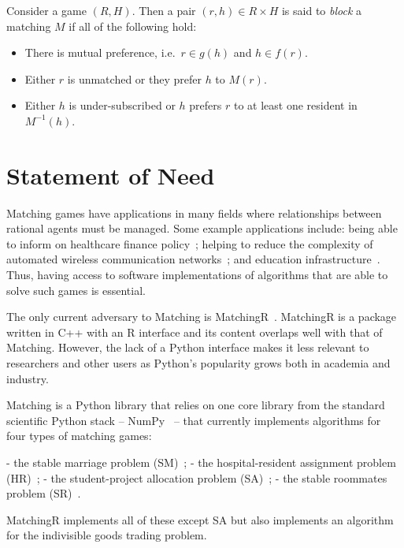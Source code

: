 \begin{definition}\label{def:blocking}
    Consider a game \((R, H)\). Then a pair \((r, h) \in R \times H\) is said to
    \emph{block} a matching \(M\) if all of the following hold:
    \begin{itemize}
        \item There is mutual preference, i.e.\ \(r \in g(h)\) and \(h \in
            f(r)\).
        \item Either \(r\) is unmatched or they prefer \(h\) to \(M(r)\).
        \item Either \(h\) is under-subscribed or \(h\) prefers \(r\) to at
            least one resident in \(M^{-1}(h)\).
    \end{itemize}
\end{definition}


\section{Statement of Need}

Matching games have applications in many fields where relationships between
rational agents must be managed. Some example applications include: being able
to inform on healthcare finance policy~\cite{Agarwal2017}; helping to reduce the
complexity of automated wireless communication networks~\cite{Bayat2016}; and
education infrastructure~\cite{Chiarandini2019}. Thus, having access to software
implementations of algorithms that are able to solve such games is essential.

The only current adversary to Matching is MatchingR~\cite{Tilly2018}. MatchingR
is a package written in C++ with an R interface and its content overlaps well
with that of Matching. However, the lack of a Python interface makes it less
relevant to researchers and other users as Python's popularity grows both in
academia and industry.

Matching is a Python library that relies on one core library from the standard
scientific Python stack -- NumPy~\cite{numpy} -- that currently implements
algorithms for four types of matching games:

- the stable marriage problem (SM)~\cite{Gale1962};
- the hospital-resident assignment problem (HR)~\cite{Gale1962,Roth1984};
- the student-project allocation problem (SA)~\cite{Abraham2007};
- the stable roommates problem (SR)~\cite{Irving1985}.

MatchingR implements all of these except SA but also implements an algorithm for
the indivisible goods trading problem.

